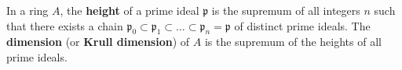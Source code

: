 In a ring $A$, the \textbf{height} of a prime ideal $\mathfrak{p}$ is the supremum of all integers $n$ such that there exists a chain $\mathfrak{p}_0 \subset \mathfrak{p}_1 \subset \ldots \subset \mathfrak{p}_n = \mathfrak{p}$ of distinct prime ideals. The \textbf{dimension} (or \textbf{Krull dimension}) of $A$ is the supremum of the heights of all prime ideals.
